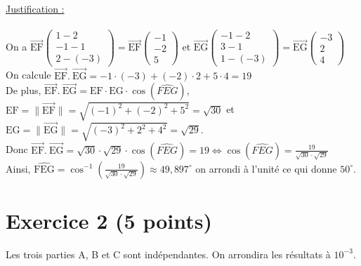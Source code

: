 \documentclass[a4paper, 12pt]{article}
\begin{document}
\noindent
\underline{Justification :}
\\ \\
On a $\overrightarrow{\text{EF}}\begin{pmatrix} 1-2 \\ -1-1 \\2-(-3)\end{pmatrix} = \overrightarrow{\text{EF}}\begin{pmatrix} -1 \\ -2 \\ 5 \end{pmatrix}$ 
et $\overrightarrow{\text{EG}}\begin{pmatrix} -1-2 \\ 3-1\\1-(-3)\end{pmatrix} = \overrightarrow{\text{EG}}\begin{pmatrix} -3 \\ 2 \\ 4 \end{pmatrix}$
\\
On calcule $\overrightarrow{\text{EF}} .\ \overrightarrow{\text{EG}} = -1 \cdot (-3) + (-2) \cdot 2 + 5 \cdot 4 = 19$
\\
De plus, $\overrightarrow{\text{EF}} .\ \overrightarrow{\text{EG}} = \text{EF} \cdot \text{EG} \cdot \cos{\left( \widehat{FEG} \right)}$, 
$\text{EF} = \|\overrightarrow{\text{EF}}\| = \sqrt{(-1)^2 + (-2)^2 + 5^2} = \sqrt{30}$ et 
$\text{EG} = \| \overrightarrow{\text{EG}} \| = \sqrt{(-3)^2 + 2^2 + 4^2} = \sqrt{29}$.
\\
Donc $\overrightarrow{\text{EF}} .\ \overrightarrow{\text{EG}} = \sqrt{30} \cdot \sqrt{29} \cdot \cos{\left( \widehat{FEG} \right)} = 19 \iff \cos{\left( \widehat{FEG} \right)} = \frac{19}{\sqrt{30} \cdot \sqrt{29}}$
\\
Ainsi, $\widehat{\text{FEG}} = \cos^{-1}{ \left( \frac{19}{ \sqrt{30} \cdot \sqrt{29}} \right) } \approx 49,897^{\circ}$ on arrondi à l'unité ce qui donne $50^{\circ}$.

{}
\section*{Exercice 2 (5 points)}

Les trois parties A, B et C sont indépendantes. On arrondira les résultats à $10^{-3}$.

{}
\end{document}
